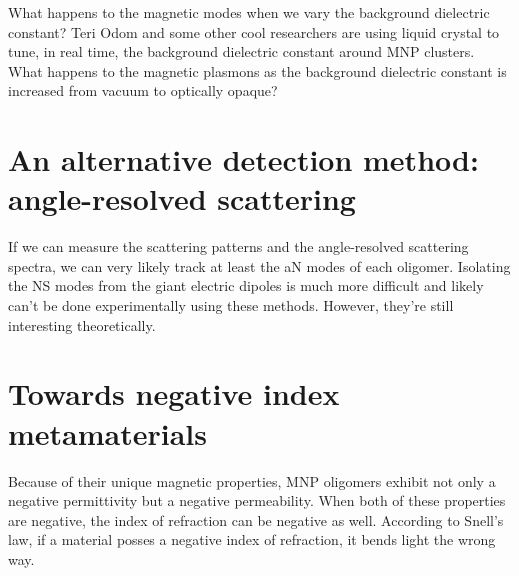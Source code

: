 \documentclass [11pt, proquest] {uwthesis}[2016/11/22]
\begin{document}
What happens to the magnetic modes when we vary the background dielectric constant? Teri Odom and some other cool researchers are using liquid crystal to tune, in real time, the background dielectric constant around MNP clusters. What happens to the magnetic plasmons as the background dielectric constant is increased from vacuum to optically opaque?

\section{An alternative detection method: angle-resolved scattering}

If we can measure the scattering patterns and the angle-resolved scattering spectra, we can very likely track at least the aN modes of each oligomer. Isolating the NS modes from the giant electric dipoles is much more difficult and likely can't be done experimentally using these methods. However, they're still interesting theoretically.

\section{Towards negative index metamaterials}

Because of their unique magnetic properties, MNP oligomers exhibit not only a negative permittivity but a negative permeability. When both of these properties are negative, the index of refraction can be negative as well. According to Snell's law, if a material posses a negative index of refraction, it bends light the wrong way.

%
%


%
\end{document}

